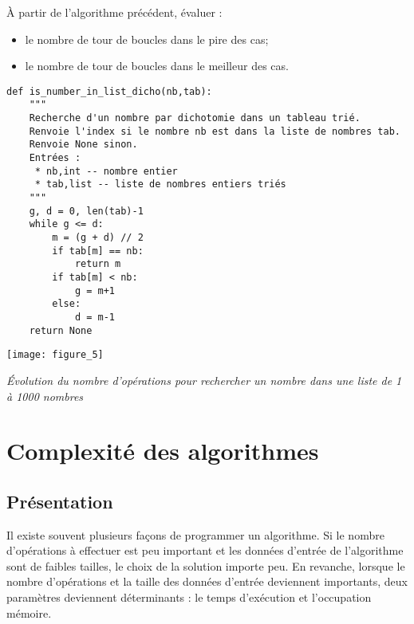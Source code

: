 \begin{minipage}[c]{.49\linewidth}
\begin{exemple}
\`A partir de l'algorithme précédent, évaluer : 
\begin{itemize}
\item le nombre de tour de boucles dans le pire des cas;
\item le nombre de tour de boucles dans le meilleur des cas.
\end{itemize}
\end{exemple}

\end{minipage}\hfill
\begin{minipage}[c]{.49\linewidth}
\begin{lstlisting}
def is_number_in_list_dicho(nb,tab):
    """ 
    Recherche d'un nombre par dichotomie dans un tableau trié. 
    Renvoie l'index si le nombre nb est dans la liste de nombres tab.
    Renvoie None sinon.
    Entrées :
     * nb,int -- nombre entier
     * tab,list -- liste de nombres entiers triés
    """
    g, d = 0, len(tab)-1
    while g <= d:
        m = (g + d) // 2
        if tab[m] == nb:
            return m
        if tab[m] < nb:
            g = m+1
        else:
            d = m-1
    return None
\end{lstlisting}



\end{minipage}






\begin{center}
\texttt{[image: figure\_5]}

\textit{Évolution du nombre d'opérations pour rechercher un nombre dans une liste de 1 à 1000 nombres}
\end{center}



\section{Complexité des algorithmes}

\subsection{Présentation}
Il existe souvent plusieurs façons de programmer un algorithme. Si le nombre d'opérations à effectuer est peu important et les données d'entrée de l'algorithme sont de faibles tailles, le choix de la solution importe peu. En revanche, lorsque le nombre d'opérations et la taille des données d'entrée deviennent importants, deux paramètres deviennent déterminants : le temps d'exécution et l'occupation mémoire. 


